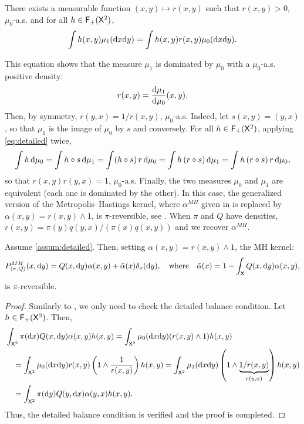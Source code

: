 \documentclass[english,graybox,envcountchap,envcountsame,sectrefs,shortlabels]{svmono}
\theoremstyle{style}
\newenvironment{hyp}[1]{
\begin{enumerate}[label=(\textbf{\sf #1}\arabic*),resume=hyp#1]\begin{sf}}
{\end{sf}\end{enumerate}}
\newcommand{\eqsp}{}
\newcommand{\Xset}{\mathsf{X}}
\begin{document}
\begin{hyp}{B}
\item \label{assum:detailed}  There exists a measurable function $(x,y)\mapsto r(x,y)$ such that $r(x,y)>0$, $\mu_0$-a.s. and for all $h\in \funcset{+}(\Xset^2)$,
\begin{equation}
\label{eq:detailed}
\int h(x,y)\mu_1(\mathrm{d} x\mathrm{d} y)=\int h(x,y) r(x,y)\mu_0(\mathrm{d} x\mathrm{d} y).
\end{equation}
\end{hyp}
This equation shows that the measure $\mu_1$ is dominated by $\mu_0$ with a $\mu_0$-a.s. positive density: 
$$
r(x,y)=\frac{\mathrm{d} \mu_1}{\mathrm{d} \mu_0}(x,y).
$$ 
Then, by symmetry, $r(y,x)=1/r(x,y)$, $\mu_0$-a.s. Indeed, let $s(x,y) = (y,x)$, so that $\mu_1$ is the image of $\mu_0$ by $s$ and conversely. For all $h\in\funcset{+}(\Xset^2)$, applying \eqref{eq:detailed} twice,
$$
\int h\,\rmd\mu_0 = \int h\circ s\,\rmd\mu_1 = \int (h\circ s)\, r\,\rmd\mu_0 = \int h\,(r\circ s)\,\rmd\mu_1 = \int h\,(r\circ s)\,r\,\rmd\mu_0\eqsp,
$$
so that $r(x,y)r(y,x) = 1$, $\mu_0$-a.s. Finally, the two measures $\mu_0$ and $\mu_1$ are equivalent (each one is dominated by the other). In this case, the generalized version of the Metropolis--Hastings kernel, where $\alpha^{MH}$ given in  is replaced by $\alpha(x,y)=r(x,y) \wedge 1$, is $\pi$-reversible, see \cite{tierney1998note}. When $\pi$ and $Q$ have densities, $r(x,y) = \pi(y)q(y,x)/(\pi(x)q(x,y))$ and we recover $\alpha^{MH}$.

\begin{lemma} \label{lem:generalMH}
Assume \ref{assum:detailed}. Then, setting $\alpha(x,y)=r(x,y) \wedge 1$, the MH kernel:
$$
\mh{\pi,Q}(x,\rmd y)=Q(x,\rmd y)\alpha(x,y)+\bar{\alpha}(x)\delta_{x}(\rmd y)\eqsp, \quad \mbox{where} \quad \bar \alpha(x)=1-\int_\Xset Q(x,\rmd y)\alpha(x,y)\eqsp,
$$
is $\pi$-reversible.
\end{lemma}


\begin{proof}
Similarly to , we only need to check the detailed balance condition. Let $h\in\funcset{+}(\Xset^2)$.  Then,
\begin{align*}
&\int_{\Xset^2} \pi(\rmd x) Q(x,\rmd y) \alpha(x,y) h(x,y)=\int_{\Xset^2} \mu_0(\rmd x\rmd y) (r(x,y)\wedge 1)  h(x,y)
\\
&\quad =\int_{\Xset^2} \mu_0(\rmd x\rmd y) r(x,y)\lr{1\wedge \frac{1}{r(x,y)}} h(x,y)=\int_{\Xset^2} \mu_1(\rmd x\rmd y) \lr{1\wedge \underbrace{1/r(x,y)}_{r(y,x)}} h(x,y)\\
&\quad =\int_{\Xset^2} \pi(\rmd y) Q(y,\rmd x) \alpha(y,x) h(x,y).
\end{align*}
Thus, the detailed balance condition is verified and the proof is completed.
\end{proof}
\end{document}

